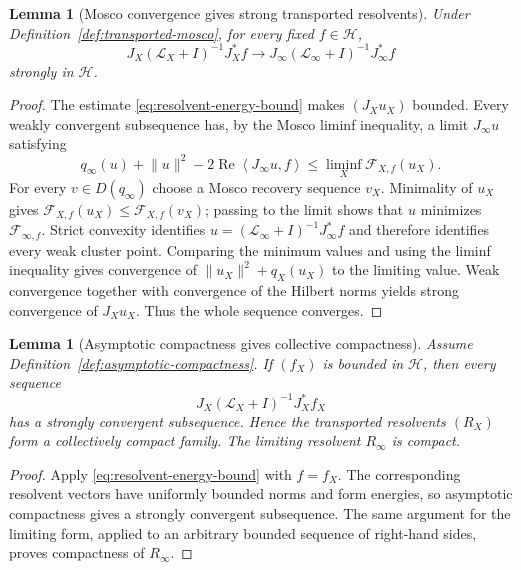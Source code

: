 \documentclass[11pt]{article}
\numberwithin{equation}{section}
\newtheorem{lemma}[theorem]{Lemma}
\theoremstyle{definition}
\theoremstyle{remark}
\newcommand{\norm}[1]{\lVert#1\rVert}
\newcommand{\ip}[2]{\left\langle#1,#2\right\rangle}
\begin{document}
\begin{lemma}[Mosco convergence gives strong transported resolvents]
\label{lem:mosco-strong-resolvent}
Under Definition~\ref{def:transported-mosco}, for every fixed
$f\in\mathscr H$,
\begin{equation}
J_X(\mathscr L_X+I)^{-1}J_X^*f
\longrightarrow
J_\infty(\mathscr L_\infty+I)^{-1}J_\infty^*f
\label{eq:strong-resolvent}
\end{equation}
strongly in $\mathscr H$.
\end{lemma}

\begin{proof}
The estimate \eqref{eq:resolvent-energy-bound} makes $(J_Xu_X)$ bounded.
Every weakly convergent subsequence has, by the Mosco liminf inequality, a
limit $J_\infty u$ satisfying
\[
q_\infty(u)+\norm u^2-2\operatorname{Re}\ip{J_\infty u}{f}
\le\liminf_X\mathcal F_{X,f}(u_X).
\]
For every $v\in D(q_\infty)$ choose a Mosco recovery sequence $v_X$.
Minimality of $u_X$ gives
$\mathcal F_{X,f}(u_X)\le\mathcal F_{X,f}(v_X)$; passing to the limit shows
that $u$ minimizes $\mathcal F_{\infty,f}$.  Strict convexity identifies
$u=(\mathscr L_\infty+I)^{-1}J_\infty^*f$ and therefore identifies every weak
cluster point.  Comparing the minimum values and using the liminf inequality
gives convergence of $\norm{u_X}^2+q_X(u_X)$ to the limiting value.  Weak
convergence together with convergence of the Hilbert norms yields strong
convergence of $J_Xu_X$.  Thus the whole sequence converges.
\end{proof}

\begin{lemma}[Asymptotic compactness gives collective compactness]
\label{lem:collective-compactness}
Assume Definition~\ref{def:asymptotic-compactness}.  If $(f_X)$ is bounded in
$\mathscr H$, then every sequence
\[
J_X(\mathscr L_X+I)^{-1}J_X^*f_X
\]
has a strongly convergent subsequence.  Hence the transported resolvents
$(R_X)$ form a collectively compact family.  The limiting resolvent $R_\infty$
is compact.
\end{lemma}

\begin{proof}
Apply \eqref{eq:resolvent-energy-bound} with $f=f_X$.  The corresponding
resolvent vectors have uniformly bounded norms and form energies, so
asymptotic compactness gives a strongly convergent subsequence.  The same
argument for the limiting form, applied to an arbitrary bounded sequence of
right-hand sides, proves compactness of $R_\infty$.
\end{proof}
\end{document}
